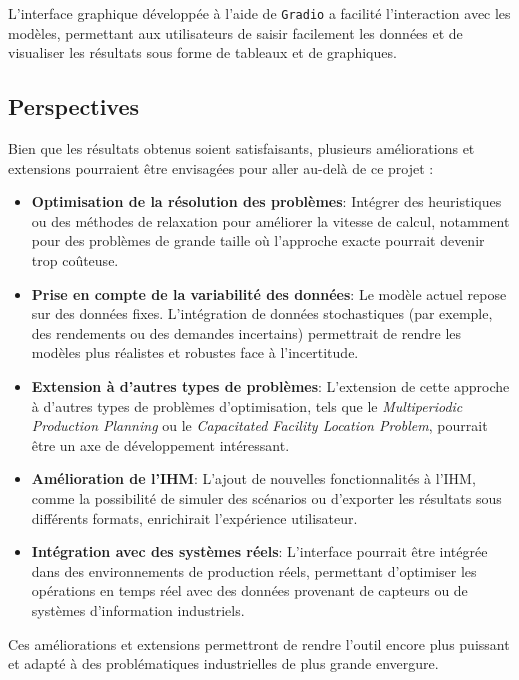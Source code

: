 \documentclass[a4paper,11pt]{article}
\begin{document}
L’interface graphique développée à l’aide de \texttt{Gradio} a facilité l'interaction avec les modèles, permettant aux utilisateurs de saisir facilement les données et de visualiser les résultats sous forme de tableaux et de graphiques.

\subsection{Perspectives}

Bien que les résultats obtenus soient satisfaisants, plusieurs améliorations et extensions pourraient être envisagées pour aller au-delà de ce projet :

\begin{itemize}
    \item \textbf{Optimisation de la résolution des problèmes}: Intégrer des heuristiques ou des méthodes de relaxation pour améliorer la vitesse de calcul, notamment pour des problèmes de grande taille où l’approche exacte pourrait devenir trop coûteuse.
    \item \textbf{Prise en compte de la variabilité des données}: Le modèle actuel repose sur des données fixes. L'intégration de données stochastiques (par exemple, des rendements ou des demandes incertains) permettrait de rendre les modèles plus réalistes et robustes face à l'incertitude.
    \item \textbf{Extension à d'autres types de problèmes}: L’extension de cette approche à d'autres types de problèmes d'optimisation, tels que le \textit{Multiperiodic Production Planning} ou le \textit{Capacitated Facility Location Problem}, pourrait être un axe de développement intéressant.
    \item \textbf{Amélioration de l'IHM}: L’ajout de nouvelles fonctionnalités à l'IHM, comme la possibilité de simuler des scénarios ou d’exporter les résultats sous différents formats, enrichirait l'expérience utilisateur.
    \item \textbf{Intégration avec des systèmes réels}: L’interface pourrait être intégrée dans des environnements de production réels, permettant d'optimiser les opérations en temps réel avec des données provenant de capteurs ou de systèmes d’information industriels.
\end{itemize}

Ces améliorations et extensions permettront de rendre l'outil encore plus puissant et adapté à des problématiques industrielles de plus grande envergure.
\end{document}
